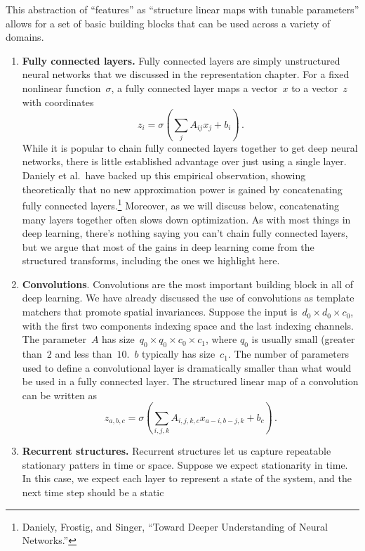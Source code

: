 \documentclass{tufte-book}
\begin{document}
This abstraction of ``features'' as ``structure linear maps with tunable
parameters'' allows for a set of basic building blocks that can be used
across a variety of domains.

\begin{enumerate}
\def\labelenumi{\arabic{enumi}.}
\item
  \textbf{Fully connected layers.} Fully connected layers are simply
  unstructured neural networks that we discussed in the representation
  chapter. For a fixed nonlinear function~\(\sigma\), a fully connected
  layer maps a vector~\(x\) to a vector~\(z\) with coordinates \[
   z_{i} = \sigma\left(\sum_j A_{ij}x_j + b_i\right)\,.
  \] While it is popular to chain fully connected layers together to get
  deep neural networks, there is little established advantage over just
  using a single layer. Daniely et al.~have backed up this empirical
  observation, showing theoretically that no new approximation power is
  gained by concatenating fully connected layers.\footnote{Daniely,
    Frostig, and Singer, {``Toward Deeper Understanding of Neural
    Networks.''}} Moreover, as we will discuss below, concatenating many
  layers together often slows down optimization. As with most things in
  deep learning, there's nothing saying you can't chain fully connected
  layers, but we argue that most of the gains in deep learning come from
  the structured transforms, including the ones we highlight here.
\item
  \textbf{Convolutions}. Convolutions are the most important building
  block in all of deep learning. We have already discussed the use of
  convolutions as template matchers that promote spatial invariances.
  Suppose the input is~\(d_0 \times d_0 \times c_0\), with the first two
  components indexing space and the last indexing channels. The
  parameter~\(A\) has size~\(q_0 \times q_0 \times c_0 \times c_1\),
  where \(q_0\) is usually small (greater than~\(2\) and less
  than~\(10\).~\(b\) typically has size~\(c_1\). The number of
  parameters used to define a convolutional layer is dramatically
  smaller than what would be used in a fully connected layer. The
  structured linear map of a convolution can be written as \[
   z_{a,b,c} = \sigma\left( \sum_{i,j,k} A_{i,j,k,c} x_{a-i,b-j,k} + b_{c} \right)\,.
  \]
\item
  \textbf{Recurrent structures.} Recurrent structures let us capture
  repeatable stationary patters in time or space. Suppose we expect
  stationarity in time. In this case, we expect each layer to represent
  a state of the system, and the next time step should be a static

\end{enumerate}
\end{document}
